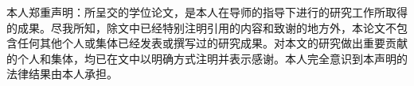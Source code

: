 \begin{thanks}
本人郑重声明：所呈交的学位论文，是本人在导师的指导下进行的研究工作所取得的成果。尽我所知，除文中已经特别注明引用的内容和致谢的地方外，本论文不包含任何其他个人或集体已经发表或撰写过的研究成果。对本文的研究做出重要贡献的个人和集体，均已在文中以明确方式注明并表示感谢。本人完全意识到本声明的法律结果由本人承担。
\end{thanks}